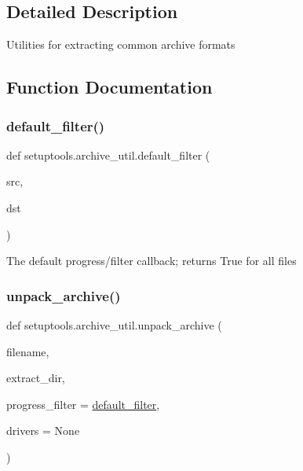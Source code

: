 \subsection{Detailed Description}
\begin{DoxyVerb}Utilities for extracting common archive formats\end{DoxyVerb}
 

\subsection{Function Documentation}
\mbox{\label{namespacesetuptools_1_1archive__util_adede8e93e57be04915ea0d27831b654b}} 
\subsubsection{\texorpdfstring{default\+\_\+filter()}{default\_filter()}}
{\footnotesize\ttfamily def setuptools.\+archive\+\_\+util.\+default\+\_\+filter (\begin{DoxyParamCaption}\item[{}]{src,  }\item[{}]{dst }\end{DoxyParamCaption})}

\begin{DoxyVerb}The default progress/filter callback; returns True for all files\end{DoxyVerb}
 \mbox{\label{namespacesetuptools_1_1archive__util_a50b89b80cdc264528d20a0b7a7964aa4}} 
\subsubsection{\texorpdfstring{unpack\+\_\+archive()}{unpack\_archive()}}
{\footnotesize\ttfamily def setuptools.\+archive\+\_\+util.\+unpack\+\_\+archive (\begin{DoxyParamCaption}\item[{}]{filename,  }\item[{}]{extract\+\_\+dir,  }\item[{}]{progress\+\_\+filter = {\ttfamily \hyperlink{namespacesetuptools_1_1archive__util_adede8e93e57be04915ea0d27831b654b}{default\+\_\+filter}},  }\item[{}]{drivers = {\ttfamily None} }\end{DoxyParamCaption})}

